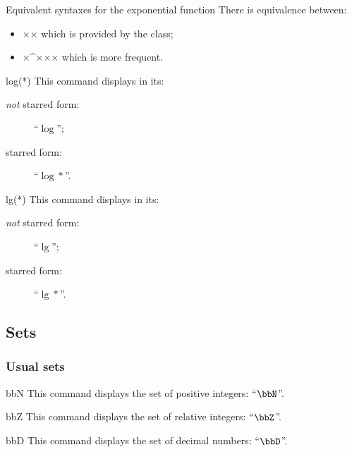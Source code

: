 \documentclass[english,nolocaltoc]{nwejmart}
\newtheorem[style=definition]{fact}
\newtheorem[title-plural=Criteria]{criterion}
\newtheorem[title=random experiment]{rexp}
\begin{document}
\begin{dbremark}{Equivalent syntaxes  for the exponential function}{}
  There is equivalence between:
  \begin{itemize}
  \item ×× which is provided by the class;
  \item ×\E^{××}× which is more frequent.
\end{itemize}
\end{dbremark}

\begin{docCommand}{log(*)}{}
  This command displays in its:
  \begin{description}
  \item[\emph{not} starred form:] \enquote{$\log$};
  \item[starred form:] \enquote{$\log*$}.
  \end{description}
\end{docCommand}

\begin{docCommand}{lg(*)}{}
  This command displays in its: 
  \begin{description}
  \item[\emph{not} starred form:] \enquote{$\lg$};
  \item[starred form:] \enquote{$\lg*$}.
  \end{description}
\end{docCommand}

\subsection{Sets}

\subsubsection{Usual sets}

\begin{docCommand}{bbN}{}
  This  command displays the set of positive integers:
  \enquote{$\bbN$}.
\end{docCommand}

\begin{docCommand}{bbZ}{}
  This  command displays the set of relative integers:
  \enquote{$\bbZ$}.
\end{docCommand}

\begin{docCommand}{bbD}{}
  This  command displays the set of decimal numbers: \enquote{$\bbD$}.
\end{docCommand}
\end{document}
